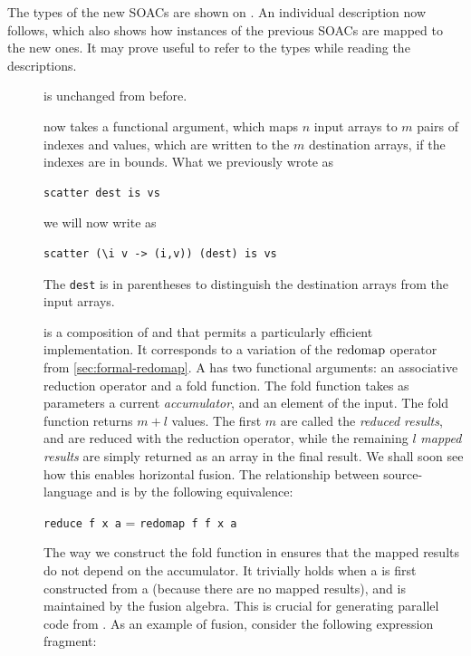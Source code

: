 The types of the new SOACs are shown on .  An
individual description now follows, which also shows how instances of
the previous SOACs are mapped to the new ones.  It may prove useful to
refer to the types while reading the descriptions.

\begin{description}
\item[{}] is unchanged from before.
\item[{}] now takes a functional argument, which maps $n$
  input arrays to $m$ pairs of indexes and values, which are written
  to the $m$ destination arrays, if the indexes are in bounds.
  What we previously wrote as
\begin{lstlisting}
scatter dest is vs
\end{lstlisting}
we will now write as
\begin{lstlisting}
scatter (\i v -> (i,v)) (dest) is vs
\end{lstlisting}
  The \lstinline{dest} is in parentheses to distinguish the
  destination arrays from the input arrays.
\item[] is a composition of  and  that
  permits a particularly efficient implementation.  It corresponds to
  a variation of the $\mathrm{redomap}$ operator from
  \cref{sec:formal-redomap}.  A  has two functional
  arguments: an associative reduction operator and a fold function.
  The fold function takes as parameters a current
  \textit{accumulator}, and an element of the input.  The 
  fold function returns $m+l$ values.  The first $m$ are called the
  \textit{reduced results}, and are reduced with the reduction
  operator, while the remaining $l$ \textit{mapped results} are simply
  returned as an array in the final result.  We shall soon see how
  this enables horizontal fusion.  The relationship between
  source-language  and  is by the
  following equivalence:\\
  \centerline{\lstinline{reduce f x a} = \lstinline{redomap f f x a}}
  The way we construct the fold function in  ensures that
  the mapped results do not depend on the accumulator.  It trivially
  holds when a  is first constructed from a 
  (because there are no mapped results), and is maintained by the
  fusion algebra.  This is crucial for generating parallel code from
  .  As an example of  fusion, consider the
  following expression fragment:
\begin{lstlisting}

\end{lstlisting}
\end{description}

